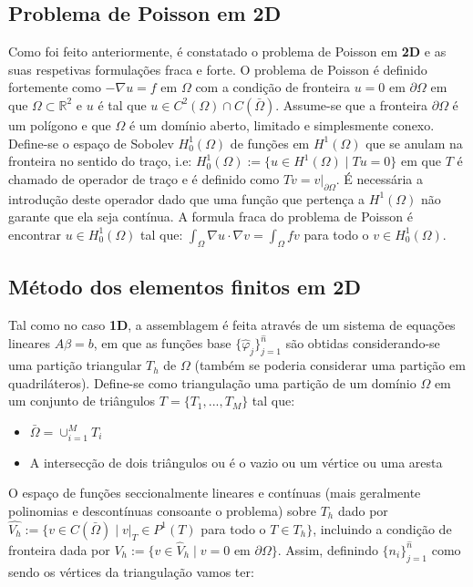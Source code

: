 \documentclass{article}
\newcommand{\R}{\mathbb{R}}
\theoremstyle{definition}
\theoremstyle{plain}
\numberwithin{equation}{section}
\newcommand{\tab}{\hspace{10mm}}
\begin{document}
\subsection{Problema de Poisson em 2D}

\tab Como foi feito anteriormente, é constatado o problema de Poisson em \textbf{2D} e as suas respetivas formulações fraca e forte. O problema de Poisson é definido fortemente como $-\nabla u = f$ em $\Omega$ com a condição de fronteira $u = 0$ em $\partial \Omega$ em que $\Omega \subset \R^2$ e $u$ é tal que $u \in C^2(\Omega) \cap C(\bar{\Omega})$. Assume-se que a fronteira $\partial \Omega$ é um polígono e que $\Omega$ é um domínio aberto, limitado e simplesmente conexo. Define-se o espaço de Sobolev $H_0^1(\Omega)$ de funções em $H^1(\Omega)$ que se anulam na fronteira no sentido do traço, i.e: $H^1_0(\Omega):=\{u \in H^1(\Omega) \; | \; Tu = 0\}$ em que $T$ é chamado de operador de traço e é definido como $Tv=v\vert_{\partial \Omega}$. É necessária a introdução deste operador dado que uma função que pertença a $H^1(\Omega)$ não garante que ela seja contínua. A formula fraca do problema de Poisson é encontrar $u\in H_0^1(\Omega)$ tal que: $\int_\Omega{\nabla u \cdot \nabla v} = \int_\Omega{fv}$ para todo o $v \in H^1_0({\Omega})$.
\subsection{Método dos elementos finitos em 2D}

\tab Tal como no caso \textbf{1D}, a assemblagem é feita através de um sistema de equações lineares $A\beta=b$, em que as funções base $\{ \hat{\varphi}_j \}_{j=1}^\hat{n}$ são obtidas considerando-se uma partição triangular $T_h$ de $\Omega$ (também se poderia considerar uma partição em quadriláteros). Define-se como triangulação uma partição de um domínio $\Omega$ em um conjunto de triângulos $ T = \{T_1,...,T_M\}$ tal que:
\vspace{3mm}
\begin{itemize}
    \item $\bar{\Omega} = \cup^M_{i=1}T_i$
    \item A intersecção de dois triângulos ou é o vazio ou um vértice ou uma aresta
\end{itemize}

\vspace{1mm}

\tab O espaço de funções seccionalmente lineares e contínuas (mais geralmente polinomias e descontínuas consoante o problema) sobre $T_h$ dado por $\hat{V_h}:=\{v \in C(\bar{\Omega}) \; | \; v\vert_{T} \in P^1(T)$ para todo  o $T \in T_h\}$, incluindo a condição de fronteira dada por $V_h:=\{v \in \hat{V}_h \; | \; v=0$ em $\partial \Omega\}$. Assim, definindo $\{n_i\}^{\hat{n}}_{j=1}$ como sendo os vértices da triangulação vamos ter: 
\end{document}
